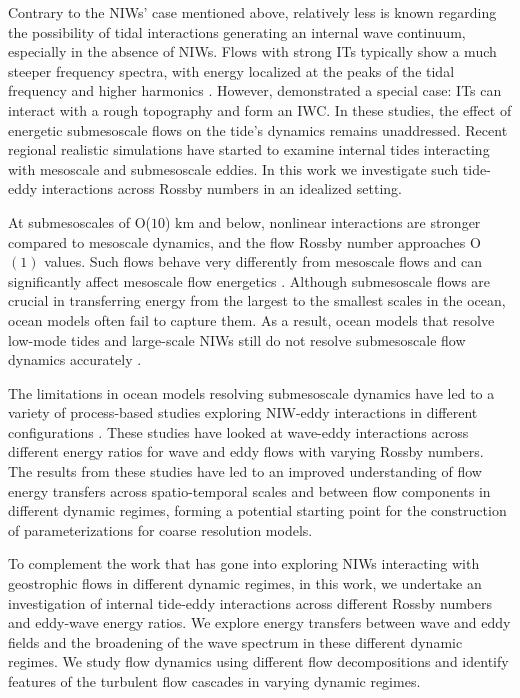 \documentclass[../Rajarshi-thesis-draft.tex]{subfiles}
\begin{document}
Contrary to the NIWs' case mentioned above, relatively less is known regarding the possibility of tidal interactions generating an internal wave continuum, especially in the absence of NIWs. Flows with strong ITs typically show a much steeper frequency spectra, with energy localized at the peaks of the tidal frequency and higher harmonics \citep{lin2020, Ansong_etal_2024, buijsman2025, rolland2025}. However, \citet{chen2019} demonstrated a special case:  ITs can interact with a rough topography and form an IWC. In these studies, the effect of energetic submesoscale flows on the tide's dynamics remains unaddressed.
Recent regional realistic simulations have started to examine internal tides interacting with mesoscale and submesoscale eddies. In this work we investigate such tide-eddy interactions across Rossby numbers in an idealized setting. %
 

At submesoscales of O($10$) km and below,   nonlinear interactions are stronger compared to mesoscale dynamics, and the flow Rossby number approaches  O$(1)$ values. Such flows behave very differently from mesoscale flows \citep{McWilliams_2016, Thomas_Tandon_Mahadevan_2008} and can significantly affect mesoscale flow energetics \citep{sasaki2017,su2018,klein2019}. Although submesoscale flows are crucial in transferring energy from the largest to the smallest scales in the ocean, ocean models often fail to capture them. As a result, ocean models that resolve low-mode tides and large-scale NIWs still do not resolve submesoscale flow dynamics accurately  \citep{Arbic_2022, Alford_MacKinnon_Simmons_Nash_2016}.

The limitations in ocean models resolving submesoscale dynamics have led to a variety of process-based studies exploring  NIW-eddy interactions in different configurations \citep{BWM17, TA20, TD20, Taylor_Straub_2020, TV22, delpech_etal_2024}. These studies have looked at wave-eddy interactions across different energy ratios for wave and eddy flows with varying Rossby numbers. The results from these studies have led to an improved understanding of flow energy transfers across spatio-temporal scales and between flow components in different dynamic regimes, forming a potential starting point for the construction of parameterizations for coarse resolution models. 


 To complement the work that has gone into exploring NIWs interacting with geostrophic flows in different dynamic regimes,  in this work, we undertake an investigation of internal tide-eddy interactions across different Rossby numbers and eddy-wave energy ratios. We explore energy transfers between wave and eddy fields and the broadening of the wave spectrum in these different dynamic regimes. We study flow dynamics using different flow decompositions and identify features of the turbulent flow cascades in varying dynamic regimes. 
\end{document}
